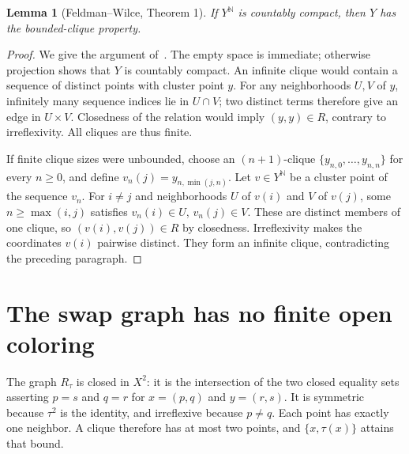 \documentclass[11pt]{article}
\newtheorem{lemma}[theorem]{Lemma}
\newcommand{\N}{\mathbb N}
\begin{document}
\begin{lemma}[Feldman--Wilce, Theorem 1]\label{criterion}
If $Y^\N$ is countably compact, then $Y$ has the bounded-clique
property.
\end{lemma}
\begin{proof}
We give the argument of~\cite[Section~3, pp.~7--8]{FW}.
The empty space is immediate; otherwise projection shows that $Y$
is countably compact. An infinite clique would contain a sequence
of distinct points with cluster point $y$. For any neighborhoods
$U,V$ of $y$, infinitely many sequence indices lie in $U\cap V$;
two distinct terms therefore give an edge in $U\times V$.
Closedness of the relation would imply $(y,y)\in R$, contrary to
irreflexivity. All cliques are thus finite.

If finite clique sizes were unbounded, choose an $(n+1)$-clique
$\{y_{n,0},\ldots,y_{n,n}\}$ for every $n\ge0$, and define
$v_n(j)=y_{n,\min(j,n)}$. Let $v\in Y^\N$ be a cluster point of
the sequence $v_n$. For $i\ne j$ and neighborhoods $U$ of $v(i)$
and $V$ of $v(j)$, some $n\ge\max(i,j)$ satisfies
$v_n(i)\in U$, $v_n(j)\in V$. These are distinct members of one
clique, so $(v(i),v(j))\in R$ by closedness. Irreflexivity makes
the coordinates $v(i)$ pairwise distinct. They form an infinite
clique, contradicting the preceding paragraph.
\end{proof}

\section{The swap graph has no finite open coloring}
The graph $R_\tau$ is closed in $X^2$: it is the intersection of
the two closed equality sets asserting $p=s$ and $q=r$ for
$x=(p,q)$ and $y=(r,s)$. It is symmetric because $\tau^2$ is the
identity, and irreflexive because $p\ne q$. Each point has exactly
one neighbor. A clique therefore has at most two points, and
$\{x,\tau(x)\}$ attains that bound.
\end{document}
